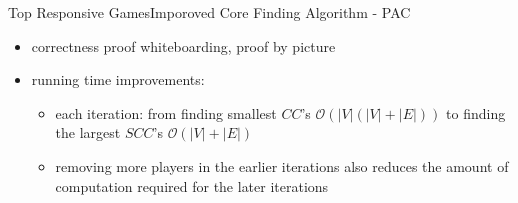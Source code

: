 \documentclass[xcolor=dvipsnames]{beamer}
\newcommand{\CC}{\mathit{CC}}
\newcommand{\SCC}{\mathit{SCC}}
\begin{document}
\begin{frame}{Top Responsive Games}{Imporoved Core Finding Algorithm - PAC}
  \begin{itemize}
    \item correctness proof
      \note whiteboarding, proof by picture
    \item running time improvements:
    \begin{itemize}
        \item each iteration: from finding smallest $\CC$'s $\mathcal{O}(|V|(|V| + |E|))$ to finding the largest $\SCC$'s $\mathcal{O}(|V| + |E|)$
        \item removing more players in the earlier iterations also reduces the amount of computation required for the later iterations
    \end{itemize}
  \end{itemize}
\end{frame}
\end{document}
